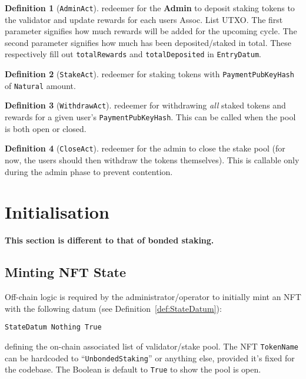 \documentclass[10pt, a4paper]{article}
\theoremstyle{definition}
\newtheorem{definition}{Definition}[section]
\begin{document}
\begin{definition}[\texttt{AdminAct}]\label{def:AdminAct} redeemer for the \textbf{Admin} to deposit staking tokens to the validator and update rewards for each users Assoc. List UTXO. The first parameter signifies how much rewards will be added for the upcoming cycle. The second parameter signifies how much has been deposited/staked in total. These respectively fill out \texttt{totalRewards} and \texttt{totalDeposited} in \texttt{EntryDatum}.
\end{definition}

\begin{definition}[\texttt{StakeAct}]\label{def:StakeAct} redeemer for staking tokens with \texttt{PaymentPubKeyHash} of \texttt{Natural} amount.
\end{definition}

\begin{definition}[\texttt{WithdrawAct}]\label{def:WithdrawAct} redeemer for withdrawing \textit{all} staked tokens and rewards for a given user's \texttt{PaymentPubKeyHash}. This can be called when the pool is both open or closed.
\end{definition}

\begin{definition}[\texttt{CloseAct}]\label{def:CloseAct} redeemer for the admin to close the stake pool (for now, the users should then withdraw the tokens themselves). This is callable only during the admin phase to prevent contention.
\end{definition}

\section{Initialisation}\label{section:initialisation}
\textbf{This section is different to that of bonded staking.}
\subsection{Minting NFT State}\label{subsection:mintNft}

Off-chain logic is required by the administrator/operator to initially mint an NFT with the following datum (see Definition~\ref{def:StateDatum}):
\begin{verbatim}
StateDatum Nothing True
\end{verbatim}
defining the on-chain associated list of validator/stake pool. The NFT \texttt{TokenName} can be hardcoded to ``\texttt{UnbondedStaking}'' or anything else, provided it's fixed for the codebase. The Boolean is default to \texttt{True} to show the pool is open.
\end{document}
